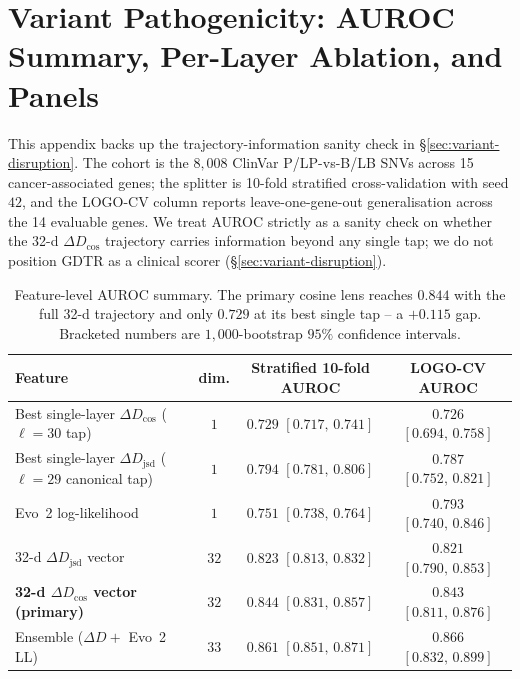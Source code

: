 \documentclass{article}
\theoremstyle{plain}
\theoremstyle{definition}
\theoremstyle{remark}
\newcommand{\gDTR}{\textsc{GDTR}}
\newcommand{\DDcos}{\Delta D_{\cos}}
\newcommand{\DDjsd}{\Delta D_{\mathrm{jsd}}}
\begin{document}
\section{Variant Pathogenicity: AUROC Summary, Per-Layer Ablation, and Panels}
\label{app:auroc-detail}

This appendix backs up the trajectory-information sanity check in
\S\ref{sec:variant-disruption}. The cohort is the $8{,}008$ ClinVar
P/LP-vs-B/LB SNVs across 15 cancer-associated genes; the splitter is
10-fold stratified cross-validation with seed $42$, and the LOGO-CV
column reports leave-one-gene-out generalisation across the 14 evaluable
genes. We treat AUROC strictly as a sanity check on whether the 32-d
$\DDcos$ trajectory carries information beyond any single tap; we do not
position \gDTR{} as a clinical scorer (\S\ref{sec:variant-disruption}).

\begin{table}[!htbp]
  \caption{Feature-level AUROC summary. The primary cosine lens reaches
    $0.844$ with the full 32-d trajectory and only $0.729$ at its best single
    tap -- a $+0.115$ gap. Bracketed numbers are $1{,}000$-bootstrap $95\%$
  confidence intervals.}
  \label{tab:auroc}
  \centering
  \small
  \begin{tabular}{@{}lccc@{}}
    \toprule
    Feature & dim. & Stratified 10-fold AUROC & LOGO-CV AUROC \\
    \midrule
    Best single-layer $\DDcos$ ($\ell=30$ tap) & $1$
    & $0.729$ $[0.717,\, 0.741]$
    & $0.726$ $[0.694,\, 0.758]$ \\
    Best single-layer $\DDjsd$ ($\ell=29$ canonical tap) & $1$
    & $0.794$ $[0.781,\, 0.806]$
    & $0.787$ $[0.752,\, 0.821]$ \\
    Evo~2 log-likelihood & $1$
    & $0.751$ $[0.738,\, 0.764]$
    & $0.793$ $[0.740,\, 0.846]$ \\
    32-d $\DDjsd$ vector & $32$
    & $0.823$ $[0.813,\, 0.832]$
    & $0.821$ $[0.790,\, 0.853]$ \\
    \textbf{32-d $\DDcos$ vector (primary)} & $32$
    & $\mathbf{0.844}$ $[0.831,\, 0.857]$
    & $\mathbf{0.843}$ $[0.811,\, 0.876]$ \\
    Ensemble ($\Delta D + $ Evo~2 LL) & $33$
    & $0.861$ $[0.851,\, 0.871]$
    & $0.866$ $[0.832,\, 0.899]$ \\
    \bottomrule
  \end{tabular}
\end{table}
\end{document}
